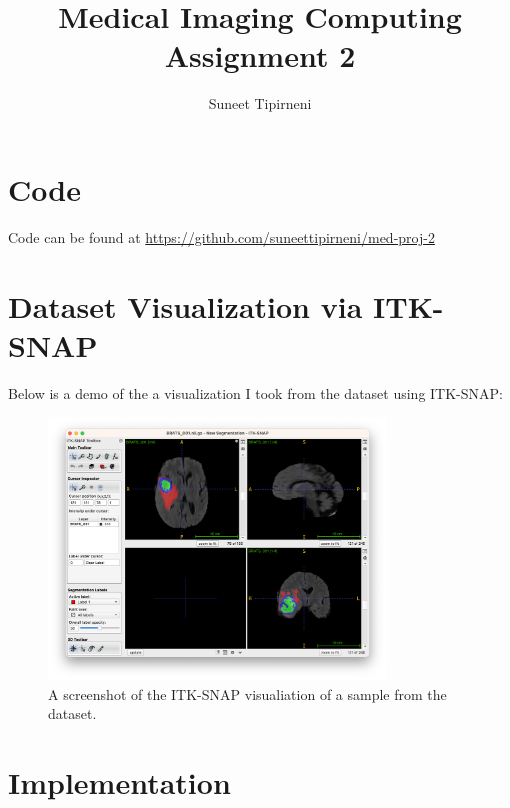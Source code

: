 \documentclass[onecolumn]{article}
\title{Medical Imaging Computing Assignment 2}
\author{Suneet Tipirneni}
\begin{document}
\maketitle
\section{Code}
Code can be found at \url{https://github.com/suneettipirneni/med-proj-2}
\section{Dataset Visualization via ITK-SNAP}

Below is a demo of the a visualization I took from the dataset using ITK-SNAP:

\begin{figure}[htpb]
	\centering
	\includegraphics[width=0.8\textwidth]{imgs/itk-snap.png}
	\caption{A screenshot of the ITK-SNAP visualiation of a sample from the dataset.}
\end{figure}

\section{Implementation}
\end{document}
